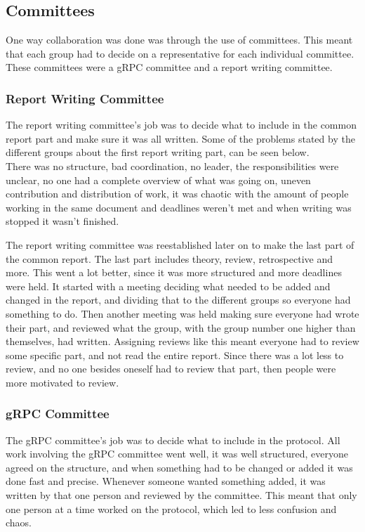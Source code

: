 \subsection{Committees}
One way collaboration was done was through the use of committees.
This meant that each group had to decide on a representative for each individual committee. These committees were a gRPC committee and a report writing committee.


\subsubsection{Report Writing Committee}
The report writing committee's job was to decide what to include in the common report part and make sure it was all written.
Some of the problems stated by the different groups about the first report writing part, can be seen below.\\
There was no structure, bad coordination, no leader, the responsibilities were unclear, no one had a complete overview of what was going on, uneven contribution and distribution of work, it was chaotic with the amount of people working in the same document and deadlines weren't met and when writing was stopped it wasn't finished.


The report writing committee was reestablished later on to make the last part of the common report. The last part includes theory, review, retrospective and more.
This went a lot better, since it was more structured and more deadlines were held.
It started with a meeting deciding what needed to be added and changed in the report, and dividing that to the different groups so everyone had something to do.
Then another meeting was held making sure everyone had wrote their part, and reviewed what the group, with the group number one higher than themselves, had written.
Assigning reviews like this meant everyone had to review some specific part, and not read the entire report. 
Since there was a lot less to review, and no one besides oneself had to review that part, then people were more motivated to review.

\subsubsection{gRPC Committee}
The gRPC committee's job was to decide what to include in the protocol.
All work involving the gRPC committee went well, it was well structured, everyone agreed on the structure, and when something had to be changed or added it was done fast and precise.
Whenever someone wanted something added, it was written by that one person and reviewed by the committee.
This meant that only one person at a time worked on the protocol, which led to less confusion and chaos.
